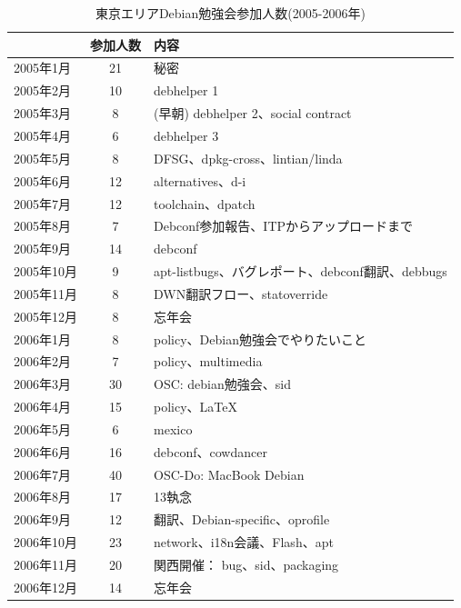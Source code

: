 \documentclass[mingoth,a4paper]{jsarticle}
\begin{document}
\begin{table}[ht]
\begin{minipage}{0.5\hsize}
 \caption{東京エリアDebian勉強会参加人数(2005-2006年)}\label{tab:count}
 \begin{center}
  \begin{tabular}{|l|c|p{10em}|}
 \hline
   & 参加人数 & 内容 \\
 \hline
   2005年1月 & 21 & 秘密\\
   2005年2月 & 10 & debhelper 1\\
   2005年3月 & 8 &  (早朝) debhelper 2、social contract\\
   2005年4月 & 6 & debhelper 3\\
   2005年5月 & 8 & DFSG、dpkg-cross、lintian/linda\\
   2005年6月 & 12 & alternatives、d-i\\
   2005年7月 & 12 & toolchain、dpatch\\
   2005年8月 & 7 & Debconf参加報告、ITPからアップロードまで\\
   2005年9月 & 14 & debconf\\
   2005年10月 & 9 & apt-listbugs、バグレポート、debconf翻訳、debbugs\\
   2005年11月 & 8 & DWN翻訳フロー、statoverride\\
   2005年12月 & 8 & 忘年会\\
   2006年1月 & 8 & policy、Debian勉強会でやりたいこと\\
   2006年2月 & 7 & policy、multimedia \\
   2006年3月 & 30 & OSC: debian勉強会、sid \\
   2006年4月 & 15 & policy、\LaTeX{} \\
   2006年5月 & 6 & mexico \\
   2006年6月 & 16 & debconf、cowdancer\\
   2006年7月 & 40 & OSC-Do: MacBook Debian \\
   2006年8月 & 17 & 13執念 \\
   2006年9月 & 12 & 翻訳、Debian-specific、oprofile \\
   2006年10月 & 23 & network、i18n会議、Flash、apt \\
   2006年11月 & 20 & 関西開催： bug、sid、packaging \\
   2006年12月 & 14 & 忘年会 \\
 \hline
  \end{tabular}
 \end{center}
\end{minipage}
\begin{minipage}{0.5\hsize}

\end{minipage}
\end{table}
\end{document}
